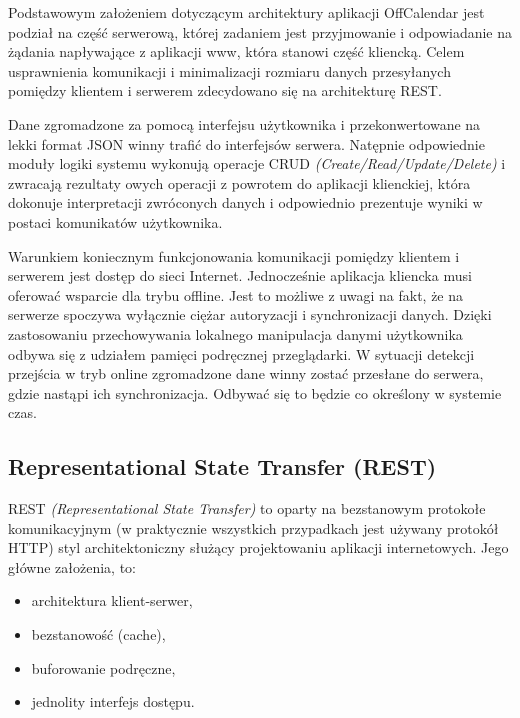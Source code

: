 Podstawowym założeniem dotyczącym architektury aplikacji OffCalendar jest podział na część serwerową, której zadaniem jest przyjmowanie i odpowiadanie na żądania napływające z aplikacji www, która stanowi część kliencką. Celem usprawnienia komunikacji i minimalizacji rozmiaru danych przesyłanych pomiędzy klientem i serwerem zdecydowano się na architekturę REST.

Dane zgromadzone za pomocą interfejsu użytkownika i przekonwertowane na lekki format JSON winny trafić do interfejsów serwera. Natępnie odpowiednie moduły logiki systemu wykonują operacje CRUD \emph{(Create/Read/Update/Delete)} i zwracają rezultaty owych operacji z powrotem do aplikacji klienckiej, która dokonuje interpretacji zwróconych danych i odpowiednio prezentuje wyniki w postaci komunikatów użytkownika.

Warunkiem koniecznym funkcjonowania komunikacji pomiędzy klientem i serwerem jest dostęp do sieci Internet. Jednocześnie aplikacja kliencka musi oferować wsparcie dla trybu offline. Jest to możliwe z uwagi na fakt, że na serwerze spoczywa wyłącznie ciężar autoryzacji i synchronizacji danych. Dzięki zastosowaniu przechowywania lokalnego manipulacja danymi użytkownika odbywa się z udziałem pamięci podręcznej przeglądarki. W sytuacji detekcji przejścia w tryb online zgromadzone dane winny zostać przesłane do serwera, gdzie nastąpi ich synchronizacja. Odbywać się to będzie co określony w systemie czas.


\subsection{Representational State Transfer (REST)}
\label{sec:REST}

REST \emph{(Representational State Transfer)} to oparty na bezstanowym protokołe komunikacyjnym (w praktycznie wszystkich przypadkach jest używany protokół HTTP) styl architektoniczny służący projektowaniu aplikacji internetowych. Jego główne założenia, to:

\begin{itemize}
\item architektura klient-serwer,
\item bezstanowość (cache),
\item buforowanie podręczne,
\item jednolity interfejs dostępu.
\end{itemize}

